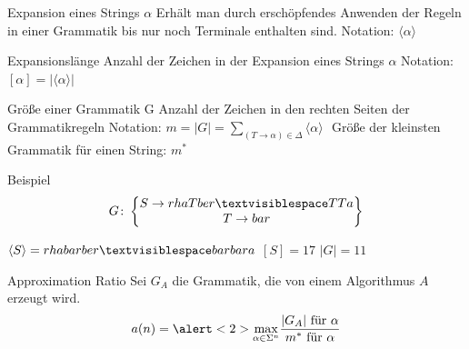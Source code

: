 \documentclass[xcolor=dvipsnames]{beamer}
\begin{document}
\begin{frame}{\FrameName}
\begin{block}{Expansion  eines Strings $\alpha$}
	\Gap
	Erhält man durch erschöpfendes Anwenden der Regeln in einer Grammatik bis nur noch Terminale enthalten sind. \linebreak
	Notation: $\langle \alpha \rangle$
\end{block}
\end{frame}

\begin{frame}{\FrameName}
\begin{block}{Expansionslänge}
	\Gap
	Anzahl der Zeichen in der Expansion eines Strings $\alpha$ \linebreak
	Notation: $[\alpha]  = \lvert \langle \alpha \rangle \lvert$
\end{block}
\end{frame}

\begin{frame}{\FrameName}
\begin{block}{Größe einer Grammatik G}
	\Gap
	Anzahl der Zeichen in den rechten Seiten der Grammatikregeln\linebreak
	Notation: $m = \lvert G \lvert = \sum\limits_{(T \rightarrow \alpha) \in \Delta} \langle \alpha \rangle$ \linebreak $ $\linebreak
	Größe der kleinsten Grammatik für einen String: $m^*$
\end{block}
\end{frame}

\begin{frame}{\FrameName}
\begin{block}{Beispiel}
	$$
	G \colon \begin{Bmatrix} 
		S \rightarrow rhaTber \textvisiblespace TTa \\
		T \rightarrow bar
	\end{Bmatrix}
	$$
	
	$\langle S \rangle = rhabarber \textvisiblespace barbara$ \linebreak
	$[S] = 17$ \linebreak
	$\lvert G \lvert = 11$
\end{block}
\end{frame}

\begin{frame}{\FrameName}
\begin{block}{Approximation Ratio}
	\Gap
	Sei $G_A$ die Grammatik, die von einem Algorithmus $A$ erzeugt wird.
	$$
	a(n) = \alert<2>{\max\limits_{\alpha \in \Sigma^n}}\frac{
		\textrm{$\lvert G_A \lvert$ für $\alpha$}
	}{
		\textrm{$m^*$ für $\alpha$}
	}
	$$
	
\end{block}
\end{frame}
\end{document}
